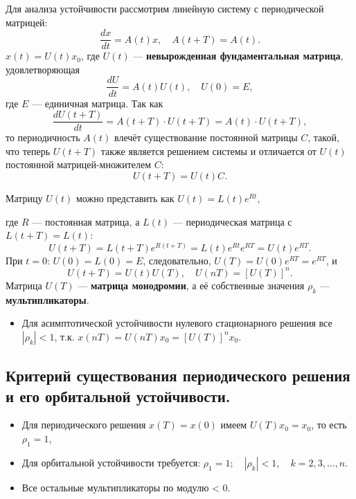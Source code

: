 	Для анализа устойчивости рассмотрим линейную систему с периодической матрицей:
	\begin{equation}
		\frac{d x}{d t} = A(t) x, \quad A(t + T) = A(t).
	\end{equation}
	\( x(t) = U(t) x_0 \), где \( U(t) \) — \textbf{невырожденная фундаментальная матрица}, удовлетворяющая
	\begin{equation}
		\frac{d U}{d t} = A(t) U(t), \quad U(0) = E,
	\end{equation}
	где \( E \) — единичная матрица. Так как
	\begin{equation}
		\frac{d U(t+T)}{dt} = A(t+T) \cdot U(t+T) = A(t) \cdot U(t+T),
	\end{equation}
	то периодичность \( A(t) \) влечёт существование постоянной матрицы \( C \), такой, что теперь $U(t + T)$ также является решением системы и отличается от $U(t)$ постоянной матрицей-множителем $C$:
	\begin{equation}
		U(t + T) = U(t) C.
	\end{equation}
	
	Матрицу \( U(t) \) можно представить как \( U(t) = L(t) e^{R t} \), 
	\par
	где \( R \) — постоянная матрица, а \( L(t) \) — периодическая матрица с \( L(t + T) = L(t) \):
	\begin{equation}
		U(t + T) = L(t + T) e^{R (t + T)} = L(t) e^{R t} e^{R T} = U(t) e^{R T}.
	\end{equation}
	При \( t = 0 \): \( U(0) = L(0) = E \), следовательно, \( U(T) = U(0) e^{R T} = e^{R T} \), и
	\begin{equation}
		U(t + T) = U(t) U(T), \quad U(n T) = [U(T)]^n.
	\end{equation}
	Матрица \( U(T) \) — \textbf{матрица монодромии}, а её собственные значения \( \rho_k \) — \textbf{мультипликаторы}.
	\begin{itemize}
		\item Для асимптотической устойчивости нулевого стационарного решения все \( |\rho_k| < 1 \), 
		т.к. \(x(nT) = U(nT)x_0 = [U(T)]^n x_0\).
	\end{itemize}
	\subsection{Критерий существования периодического решения и его орбитальной устойчивости.}
	\begin{itemize}
		\item Для периодического решения \( x(T) = x(0) \) имеем \( U(T) x_0 = x_0 \), то есть \( \rho_1 = 1 \), 
		\item Для орбитальной устойчивости требуется: \(\rho_1 = 1; \quad |\rho_k| < 1, \quad k = 2, 3, \ldots, n.\)
		\item Все остальные мультипликаторы по модулю < 0.
	\end{itemize}
	
